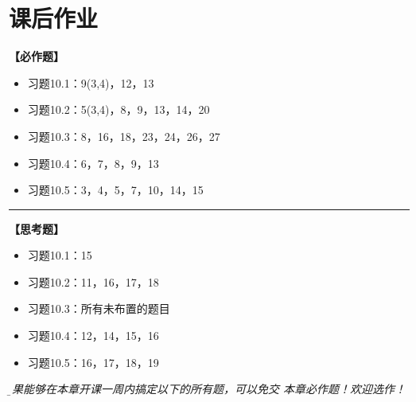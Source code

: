 \setcounter{chapter}{9}



\newpage

\section*{课后作业}

{\bf 【必作题】}

\begin{itemize}
  \setlength{\itemindent}{1cm}
  \item 习题10.1：9(3,4)，12，13
  \item 习题10.2：5(3,4)，8，9，13，14，20
  \item 习题10.3：8，16，18，23，24，26，27
  \item 习题10.4：6，7，8，9，13
  \item 习题10.5：3，4，5，7，10，14，15
\end{itemize}

\bigskip

\hrule

\bigskip

{\bf 【思考题】}

\begin{itemize}
  \setlength{\itemindent}{1cm}
  \item 习题10.1：15
  \item 习题10.2：11，16，17，18
  \item 习题10.3：所有未布置的题目
  \item 习题10.4：12，14，15，16
  \item 习题10.5：16，17，18，19
\end{itemize}

{\it\b 如果能够在本章开课一周内搞定以下的所有题，可以免交
本章必作题！欢迎选作！}

